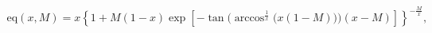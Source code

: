 \documentclass{article}
\begin{document}
\begin{gather*}
    \text{eq}(x,M) = 
    x\left\{
        1 + M (1 - x) \exp[-
            \tan \bigg(
                \arccos ^ {\frac{1}{x}}\big(
                    x(1 - M)
                \big)
            \bigg)
            (x - M)
         ]
    \right\} ^ {
        -\frac{
            M
        }{
            x
        }
    },\\

\end{gather*}
\end{document}
